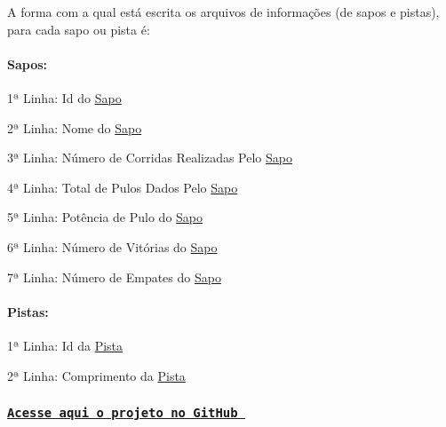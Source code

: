 A forma com a qual está escrita os arquivos de informações (de sapos e pistas), para cada sapo ou pista é\+:

\paragraph*{Sapos\+:}

1ª Linha\+: Id do \hyperlink{classSapo}{Sapo} 

2ª Linha\+: Nome do \hyperlink{classSapo}{Sapo} 

3ª Linha\+: Número de Corridas Realizadas Pelo \hyperlink{classSapo}{Sapo} 

4ª Linha\+: Total de Pulos Dados Pelo \hyperlink{classSapo}{Sapo} 

5ª Linha\+: Potência de Pulo do \hyperlink{classSapo}{Sapo} 

6ª Linha\+: Número de Vitórias do \hyperlink{classSapo}{Sapo} 

7ª Linha\+: Número de Empates do \hyperlink{classSapo}{Sapo}

\paragraph*{Pistas\+:}

1ª Linha\+: Id da \hyperlink{classPista}{Pista} 

2ª Linha\+: Comprimento da \hyperlink{classPista}{Pista}

\subsubsection*{\href{https://github.com/lucasgmpaiva/Avaliacao_III_LP}{\tt Acesse aqui o projeto no Git\+Hub }}
